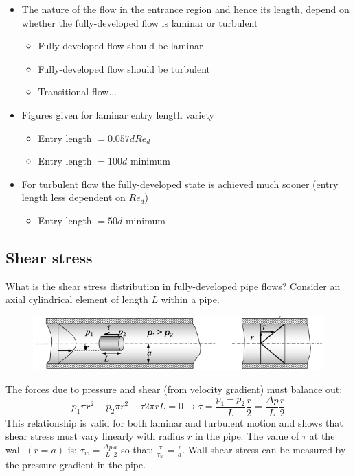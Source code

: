 \documentclass[class=report, crop=false, 12pt,a4paper]{standalone}
\begin{document}
\begin{itemize}
  \item The nature of the flow in the entrance region and hence its length, depend on whether the fully-developed flow is laminar or turbulent
  \begin{itemize}
    \item {} Fully-developed flow should be laminar
    \item {} Fully-developed flow should be turbulent
    \item {} Transitional flow...
  \end{itemize}
  \item Figures given for laminar entry length variety
  \begin{itemize}
    \item {} Entry length $=0.057 d Re_d$
    \item {} Entry length $=100d$ minimum
  \end{itemize}
  \item For turbulent flow the fully-developed state is achieved much sooner (entry length less dependent on $Re_d$)
  \begin{itemize}
    \item {} Entry length $=50d$ minimum
  \end{itemize}
\end{itemize}
\subsection{Shear stress}
What is the shear stress distribution in fully-developed pipe flows? Consider an axial cylindrical element of length $L$ within a pipe.
\begin{figure}[H]
  \centering
  \includegraphics[width = 0.9 \textwidth]{../img/diagram81.png}
  \caption{}
\end{figure}
The forces due to pressure and shear (from velocity gradient) must balance out:
\begin{equation}
  p_1 \pi r^2 - p_2 \pi r^2 - \tau 2 \pi r L = 0 \rightarrow \tau = \frac{p_1 - p_2}{L} \frac{r}{2} = \frac{\Delta p}{L} \frac{r}{2} 
\end{equation}
This relationship is valid for both laminar and turbulent motion and shows that shear stress must vary linearly with radius $r$ in the pipe. The value of $\tau$ at the wall $\left( r = a \right)$ is: $\tau_w = \frac{\Delta p}{L} \frac{a}{2}$ so that: $\frac{\tau}{\tau_w} = \frac{r}{a}$. Wall shear stress can be measured by the pressure gradient in the pipe.
\end{document}
